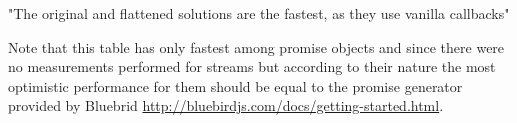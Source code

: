 "The original and flattened solutions are the fastest, as they use vanilla callbacks"\cite{asyncPerformance}

Note that this table has only fastest among promise objects and since there were no measurements performed for streams but according to their nature the most optimistic performance for them should be equal to the promise generator provided by Bluebrid \url{http://bluebirdjs.com/docs/getting-started.html}.



